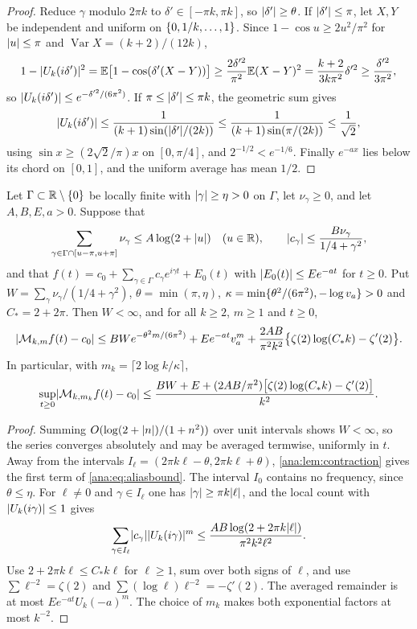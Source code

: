 \begin{proof}
Reduce $\gamma$ modulo $2\pi k$ to $\delta'\in[-\pi k,\pi k]$, so $\lvert\delta'\rvert\ge\theta$. If
$\lvert\delta'\rvert\le\pi$, let $X,Y$ be independent and uniform on $\{0,1/k,\dots,1\}$. Since
$1-\cos u\ge2u^2/\pi^2$ for $\lvert u\rvert\le\pi$ and $\operatorname{Var}X=(k+2)/(12k)$,
\[
 1-\lvert U_k(i\delta')\rvert^2=\mathbb{E}\bigl[1-\cos(\delta'(X-Y))\bigr]
 \ge\frac{2\delta'^2}{\pi^2}\mathbb{E}(X-Y)^2=\frac{k+2}{3k\pi^2}\delta'^2\ge\frac{\delta'^2}{3\pi^2},
\]
so $\lvert U_k(i\delta')\rvert\le e^{-\delta'^2/(6\pi^2)}$. If $\pi\le\lvert\delta'\rvert\le\pi k$, the
geometric sum gives
\[
 \lvert U_k(i\delta')\rvert\le\frac1{(k+1)\sin(\lvert\delta'\rvert/(2k))}\le\frac1{(k+1)\sin(\pi/(2k))}
 \le\frac1{\sqrt2},
\]
using $\sin x\ge(2\sqrt2/\pi)x$ on $[0,\pi/4]$, and $2^{-1/2}<e^{-1/6}$. Finally $e^{-ax}$ lies
below its chord on $[0,1]$, and the uniform average has mean $1/2$.
\end{proof}

\begin{theorem}\label{ana:thm:alias}
Let $\Gamma\subset\mathbb{R}\setminus\{0\}$ be locally finite with $\lvert\gamma\rvert\ge\eta>0$ on $\Gamma$, let
$\nu_\gamma\ge0$, and let $A,B,E,a>0$. Suppose that
\[
 \sum_{\gamma\in\Gamma\cap[u-\pi,u+\pi]}\nu_\gamma\le A\log(2+\lvert u\rvert)\quad(u\in\mathbb{R}),\qquad
 \lvert c_\gamma\rvert\le\frac{B\nu_\gamma}{1/4+\gamma^2},
\]
and that $f(t)=c_0+\sum_{\gamma\in\Gamma}c_\gamma e^{i\gamma t}+E_0(t)$ with
$\lvert E_0(t)\rvert\le Ee^{-at}$ for $t\ge0$. Put $W=\sum_\gamma\nu_\gamma/(1/4+\gamma^2)$,
$\theta=\min(\pi,\eta)$, $\kappa=\min\{\theta^2/(6\pi^2),-\log v_a\}>0$ and $C_*=2+2\pi$. Then
$W<\infty$, and for all $k\ge2$, $m\ge1$ and $t\ge0$,
\begin{equation}\label{ana:eq:aliasbound}
 \lvert\mathcal{M}_{k,m}f(t)-c_0\rvert\le BWe^{-\theta^2m/(6\pi^2)}+Ee^{-at}v_a^m
 +\frac{2AB}{\pi^2k^2}\bigl\{\zeta(2)\log(C_*k)-\zeta'(2)\bigr\}.
\end{equation}
In particular, with $m_k=\lceil2\log k/\kappa\rceil$,
\[
 \sup_{t\ge0}\lvert\mathcal{M}_{k,m_k}f(t)-c_0\rvert
 \le\frac{BW+E+(2AB/\pi^2)\bigl[\zeta(2)\log(C_*k)-\zeta'(2)\bigr]}{k^2}.
\]
\end{theorem}

\begin{proof}
Summing $O(\log(2+\lvert n\rvert)/(1+n^2))$ over unit intervals shows $W<\infty$, so the series converges
absolutely and may be averaged termwise, uniformly in $t$. Away from the intervals
$I_\ell=(2\pi k\ell-\theta,2\pi k\ell+\theta)$, \cref{ana:lem:contraction} gives the first term
of \eqref{ana:eq:aliasbound}. The interval $I_0$ contains no frequency, since $\theta\le\eta$.
For $\ell\ne0$ and $\gamma\in I_\ell$ one has $\lvert\gamma\rvert\ge\pi k\lvert\ell\rvert$, and the local count
with $\lvert U_k(i\gamma)\rvert\le1$ gives
\[
 \sum_{\gamma\in I_\ell}\lvert c_\gamma\rvert\lvert U_k(i\gamma)\rvert^m\le
 \frac{AB\log(2+2\pi k\lvert\ell\rvert)}{\pi^2k^2\ell^2}.
\]
Use $2+2\pi k\ell\le C_*k\ell$ for $\ell\ge1$, sum over both signs of $\ell$, and use
$\sum\ell^{-2}=\zeta(2)$ and $\sum(\log\ell)\ell^{-2}=-\zeta'(2)$. The averaged remainder is at
most $Ee^{-at}U_k(-a)^m$. The choice of $m_k$ makes both exponential factors at most $k^{-2}$.
\end{proof}

